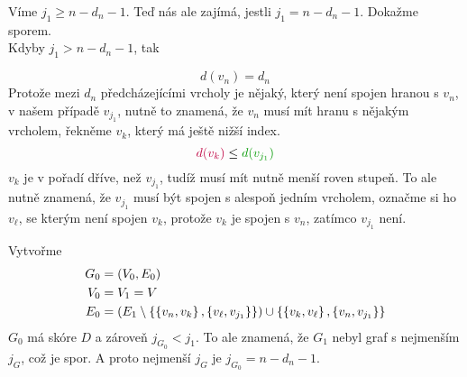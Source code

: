 Víme $j_1 \geq n-d_n-1$. Teď nás ale zajímá, jestli $j_1 = n - d_n - 1$. Dokažme sporem.\\
Kdyby $j_1 > n-d_n-1$, tak
\begin{figure}[H]
    \centering
\end{figure}
\vspace{-1.5cm}
\[
    d(v_n) = d_n
\]
Protože mezi $d_n$ předcházejícími vrcholy je nějaký, který není spojen hranou s $v_n$, v našem případě $v_{j_1}$, nutně 
to znamená, že $v_n$ musí mít hranu s nějakým vrcholem, řekněme $v_k$, který má ještě nižší index.
\[
    \textcolor{purple}{d(v_k)} \leq \textcolor{green!60!black}{d(v_{j_1})}
\]
$v_k$ je v pořadí dříve, než $v_{j_1}$, tudíž musí mít nutně menší roven stupeň. To ale nutně znamená, že $v_{j_1}$ musí
být spojen s alespoň jedním vrcholem, označme si ho $v_\ell$, se kterým není spojen $v_k$, protože $v_k$ je spojen s 
$v_n$, zatímco $v_{j_1}$ není.

Vytvořme
\vspace{-0.5cm}
\begin{align*}
    G_0 &= (V_0, E_0) \\
    V_0 &= V_1 = V \\
    E_0 &= (E_1 \setminus \left\lbrace \left\lbrace v_n, v_k \right\rbrace, \left\lbrace v_\ell, v_{j_1} \right\rbrace \right\rbrace) \cup \left\lbrace \left\lbrace v_k, v_\ell \right\rbrace, \left\lbrace v_n, v_{j_1} \right\rbrace \right\rbrace
\end{align*}
$G_0$ má skóre $D$ a zároveň $j_{G_0} < j_1$. To ale znamená, že $G_1$ nebyl graf s nejmenším $j_G$, což je spor. A 
proto nejmenší $j_G$ je $j_{G_0} = n-d_n-1$.

